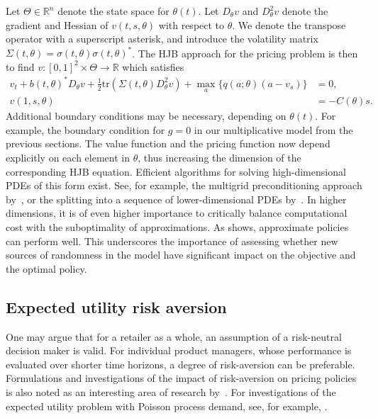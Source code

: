 \documentclass[main.tex]{subfiles}
\begin{document}
Let $\Theta\in\mathbb R^n$ denote the state space for
$\theta(t)$.
Let $D_\theta v$ and $D_\theta^2v$ denote the gradient and Hessian of
$v(t,s,\theta)$ with respect to $\theta$. We denote the transpose
operator with a superscript asterisk, and introduce the
volatility matrix $\Sigma(t,\theta) = \sigma(t,\theta){\sigma(t,\theta)}^*$.
The HJB approach for the pricing problem is then to find
$v:{[0,1]}^2\times\Theta\to\mathbb R$ which satisfies
\begin{align}
  v_t+{b(t,\theta)}^* D_\theta v
  + {\textstyle\frac{1}{2}}\mbox{tr}\left( \Sigma(t,\theta)
  D_\theta^2v \right)
  +\max_{a}\{q(a;\theta)(a-v_s)\}&=0,\\
  v(1,s,\theta) &= -C(\theta)s.
\end{align}
Additional boundary conditions may be necessary, depending on
$\theta(t)$. For example, the boundary condition for $g=0$ in our
multiplicative model from the previous sections.
The value function and the pricing function now depend
explicitly on each element in $\theta$, thus increasing the dimension
of the corresponding HJB equation. Efficient algorithms for solving
high-dimensional PDEs of this form exist. See, for example, the
multigrid preconditioning approach by~\cite{reisinger2017boundary}, or
the splitting into a sequence of lower-dimensional PDEs by~\cite{reisinger2017finite}.
In higher dimensions, it is of even higher importance to critically
balance computational cost with the suboptimality of
approximations. As  shows, approximate
policies can perform well. This underscores the importance of assessing whether
new sources of randomness in the model have significant impact on the
objective and the optimal policy.


\subsection{Expected utility risk aversion}
One may argue that for a retailer as a whole, an assumption of a
risk-neutral decision maker is valid. For individual product managers,
whose performance is evaluated over shorter time horizons, a degree of
risk-aversion can be preferable. Formulations and investigations of the
impact of risk-aversion on pricing policies is also noted as an
interesting area of research by~\cite{bitran2003overview}.
For investigations of the expected utility problem with Poisson process
demand, see, for example, \citet{lim2007relative,feng2008risk}.
\end{document}
